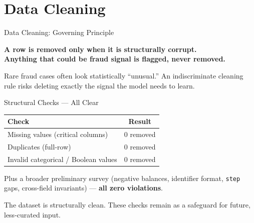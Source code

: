 \documentclass[aspectratio=169]{beamer}
\begin{document}
\section{Data Cleaning}

\begin{frame}{Data Cleaning: Governing Principle}
\begin{center}
\Large
\textbf{A row is removed only when it is structurally corrupt.}\\[0.3cm]
\textbf{Anything that could be fraud signal is flagged, never removed.}
\end{center}
\vspace{0.5cm}
Rare fraud cases often look statistically ``unusual.'' An indiscriminate cleaning rule risks deleting exactly the signal the model needs to learn.
\end{frame}

\begin{frame}{Structural Checks --- All Clear}
\centering
\begin{tabular}{@{}lc@{}}
\toprule
\textbf{Check} & \textbf{Result} \\
\midrule
Missing values (critical columns) & 0 removed \\
Duplicates (full-row) & 0 removed \\
Invalid categorical / Boolean values & 0 removed \\
\bottomrule
\end{tabular}
\vspace{0.4cm}

Plus a broader preliminary survey (negative balances, identifier format, \texttt{step} gaps, cross-field invariants) --- \textbf{all zero violations}.
\vspace{0.3cm}

The dataset is structurally clean. These checks remain as a safeguard for future, less-curated input.
\end{frame}
\end{document}
